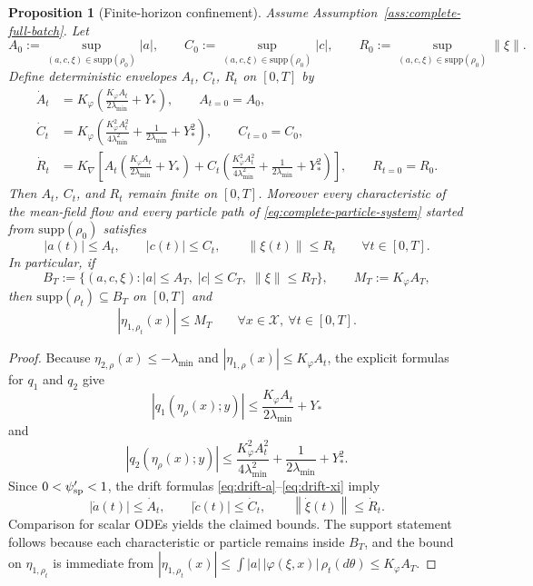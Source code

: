 \documentclass[11pt]{article}
\newtheorem{proposition}[theorem]{Proposition}
\theoremstyle{definition}
\newcommand{\supp}{\mathrm{supp}}
\newcommand{\norm}[1]{\left\lVert #1 \right\rVert}
\newcommand{\mc}[1]{\mathcal{#1}}
\begin{document}
\begin{proposition}[Finite-horizon confinement]
\label{prop:softplus-confinement}
Assume Assumption~\ref{ass:complete-full-batch}. Let
\[
  A_0:=\sup_{(a,c,\xi)\in\supp(\rho_0)} |a|,
  \qquad
  C_0:=\sup_{(a,c,\xi)\in\supp(\rho_0)} |c|,
  \qquad
  R_0:=\sup_{(a,c,\xi)\in\supp(\rho_0)} \norm{\xi}.
\]
Define deterministic envelopes $A_t$, $C_t$, $R_t$ on $[0,T]$ by
\begin{align}
  \dot A_t
  &=
  K_\varphi
  \left(
    \frac{K_\varphi A_t}{2\lambda_{\min}}+Y_\ast
  \right),
  \qquad
  A_{t=0}=A_0,
  \label{eq:A-envelope}
  \\
  \dot C_t
  &=
  K_\varphi
  \left(
    \frac{K_\varphi^2 A_t^2}{4\lambda_{\min}^2}
    +
    \frac{1}{2\lambda_{\min}}
    +
    Y_\ast^2
  \right),
  \qquad
  C_{t=0}=C_0,
  \label{eq:C-envelope}
  \\
  \dot R_t
  &=
  K_{\nabla}
  \left[
    A_t\left(\frac{K_\varphi A_t}{2\lambda_{\min}}+Y_\ast\right)
    +
    C_t\left(
      \frac{K_\varphi^2 A_t^2}{4\lambda_{\min}^2}
      +
      \frac{1}{2\lambda_{\min}}
      +
      Y_\ast^2
    \right)
  \right],
  \qquad
  R_{t=0}=R_0.
  \label{eq:R-envelope}
\end{align}
Then $A_t$, $C_t$, and $R_t$ remain finite on $[0,T]$. Moreover every
characteristic of the mean-field flow and every particle path of
\eqref{eq:complete-particle-system} started from $\supp(\rho_0)$ satisfies
\[
  |a(t)|\le A_t,
  \qquad
  |c(t)|\le C_t,
  \qquad
  \norm{\xi(t)}\le R_t
  \qquad
  \forall t\in[0,T].
\]
In particular, if
\[
  B_T
  :=
  \{(a,c,\xi): |a|\le A_T,\; |c|\le C_T,\; \norm{\xi}\le R_T\},
  \qquad
  M_T:=K_\varphi A_T,
\]
then $\supp(\rho_t)\subseteq B_T$ on $[0,T]$ and
\[
  |\eta_{1,\rho_t}(x)|\le M_T
  \qquad
  \forall x\in\mc{X},\ \forall t\in[0,T].
\]
\end{proposition}

\begin{proof}
Because $\eta_{2,\rho}(x)\le -\lambda_{\min}$ and
$|\eta_{1,\rho}(x)|\le K_\varphi A_t$, the explicit formulas for $q_1$ and
$q_2$ give
\[
  |q_1(\eta_\rho(x);y)|
  \le
  \frac{K_\varphi A_t}{2\lambda_{\min}}+Y_\ast
\]
and
\[
  |q_2(\eta_\rho(x);y)|
  \le
  \frac{K_\varphi^2 A_t^2}{4\lambda_{\min}^2}
  +
  \frac{1}{2\lambda_{\min}}
  +
  Y_\ast^2.
\]
Since $0<\psi_{\rm sp}'< 1$, the drift formulas
\eqref{eq:drift-a}--\eqref{eq:drift-xi} imply
\[
  |\dot a(t)|\le \dot A_t,
  \qquad
  |\dot c(t)|\le \dot C_t,
  \qquad
  \norm{\dot\xi(t)}\le \dot R_t.
\]
Comparison for scalar ODEs yields the claimed bounds. The support statement
follows because each characteristic or particle remains inside $B_T$, and the
bound on $\eta_{1,\rho_t}$ is immediate from
$|\eta_{1,\rho_t}(x)|\le \int |a|\,|\varphi(\xi,x)|\,\rho_t(d\theta)\le K_\varphi A_T$.
\end{proof}
\end{document}
